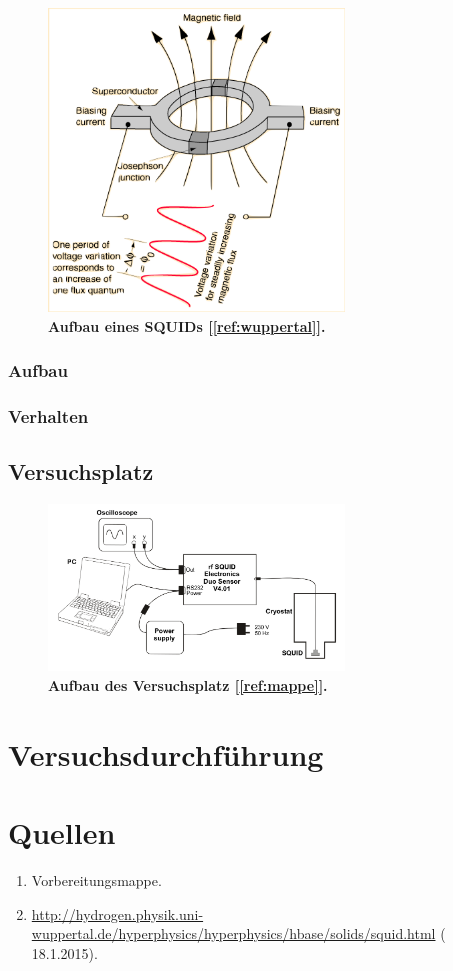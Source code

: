 \documentclass[a4paper,ngerman]{scrartcl}
\begin{document}
\begin{figure}[tb!]
\centering
\includegraphics[width=0.7\textwidth]{abbildungen/squide.png}
\caption[Versuchsplatz]{\textbf{Aufbau eines SQUIDs [\ref{ref:wuppertal}].}}
\label{fig:squid_wuppertal}
\end{figure}

\subsubsection{Aufbau}

\subsubsection{Verhalten}

\subsection{Versuchsplatz}

\begin{figure}[tb!]
\centering
\includegraphics[width=0.7\textwidth]{abbildungen/aufbau_versuchsplatz.png}
\caption[Versuchsplatz]{\textbf{Aufbau des Versuchsplatz [\ref{ref:mappe}].}}
\label{fig:Versuchsplatz}
\end{figure}



\section{Versuchsdurchführung}


\section{Quellen}
\begin{enumerate}
\item Vorbereitungsmappe.\label{ref:mappe}
\item \url{http://hydrogen.physik.uni-wuppertal.de/hyperphysics/hyperphysics/hbase/solids/squid.html} ( 18.1.2015).\label{ref:wuppertal}
\end{enumerate}
\end{document}
